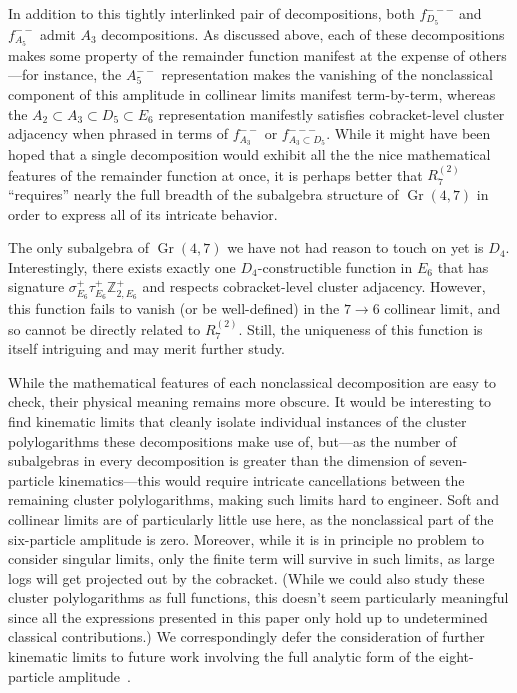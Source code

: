 \documentclass[12pt]{article}
\DeclareMathOperator{\Gr}{Gr}
\begin{document}
In addition to this tightly interlinked pair of decompositions, both $f_{D_5}^{---}$ and $f_{A_5}^{--}$ admit $A_3$ decompositions. As discussed above, each of these decompositions makes some property of the remainder function manifest at the expense of others---for instance, the $A_5^{--}$ representation makes the vanishing of the nonclassical component of this amplitude in collinear limits manifest term-by-term, whereas the $A_2 \subset A_3 \subset D_5 \subset E_6$ representation manifestly satisfies cobracket-level cluster adjacency when phrased in terms of $f_{A_3}^{--}$ or $f_{A_3\subset D_5}^{---}$. While it might have been hoped that a single decomposition would exhibit all the the nice mathematical features of the remainder function at once, it is perhaps better that $R^{(2)}_7$ ``requires'' nearly the full breadth of the subalgebra structure of $\Gr(4,7)$ in order to express all of its intricate behavior. 

The only subalgebra of $\Gr(4,7)$ we have not had reason to touch on yet is $D_4$. Interestingly, there exists exactly one $D_4$-constructible function in $E_6$ that has signature $\sigma_{E_6}^+ \tau_{E_6}^+ \mathbb{Z}_{2,E_6}^+$ and respects cobracket-level cluster adjacency. However, this function fails to vanish (or be well-defined) in the $7\to6$ collinear limit, and so cannot be directly related to $R_{7}^{(2)}\!$. Still, the uniqueness of this function is itself intriguing and may merit further study.

While the mathematical features of each nonclassical decomposition are easy to check, their physical meaning remains more obscure. It would be interesting to find kinematic limits that cleanly isolate individual instances of the cluster polylogarithms these decompositions make use of, but---as the number of subalgebras in every decomposition is greater than the dimension of seven-particle kinematics---this would require intricate cancellations between the remaining cluster polylogarithms, making such limits hard to engineer. Soft and collinear limits are of particularly little use here, as the nonclassical part of the six-particle amplitude is zero. Moreover, while it is in principle no problem to consider singular limits, only the finite term will survive in such limits, as large logs will get projected out by the cobracket. (While we could also study these cluster polylogarithms as full functions, this doesn't seem particularly meaningful since all the expressions presented in this paper only hold up to undetermined classical contributions.)  We correspondingly defer the consideration of further kinematic limits to future work involving the full analytic form of the eight-particle amplitude~\cite{cluster_subalgebras_ii}.
\end{document}
